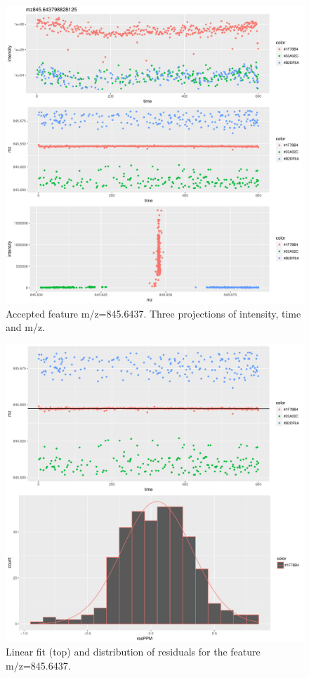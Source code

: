 \documentclass[]{article}
\begin{document}
\begin{figure}[H]
\begin{center}
\includegraphics{Supplementary_document_files/figure-latex/cluster.mz.845-1.pdf}
\caption{Accepted feature m/z=845.6437. Three projections of intensity, time and m/z.}
\label{fig:d3.mz.845.6437}
\end{center}
\end{figure}

\begin{figure}[H]
\begin{center}
\includegraphics{Supplementary_document_files/figure-latex/filter.lm.845-1.pdf}
\caption{Linear fit (top) and distribution of residuals for the  feature m/z=845.6437.}
\label{ig:chk.mz.845.6437}
\end{center}
\end{figure}
\end{document}
